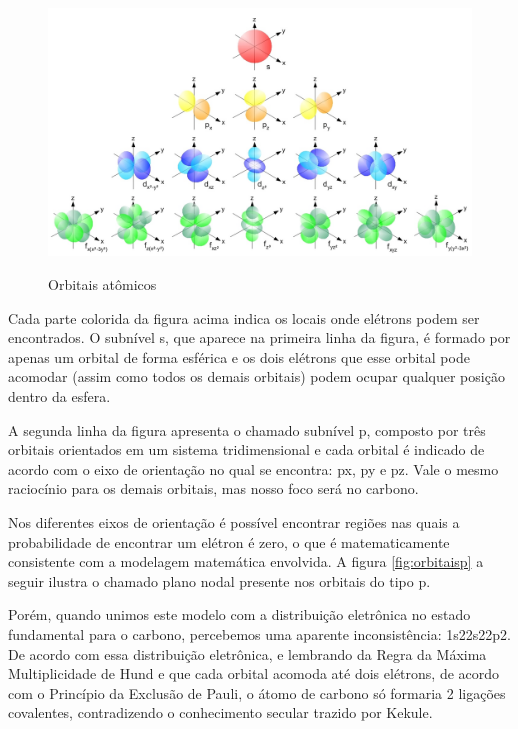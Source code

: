 \documentclass[a4paper,12pt]{book}
\begin{document}
\begin{figure}[h]
	\caption{Orbitais atômicos}
	\vspace{0.25cm}
	\includegraphics[width=1\linewidth]{imagens/figura8_orbitais.jpg} 
	\label{fig:orbitais}
\end{figure}

Cada parte colorida da figura acima indica os locais onde elétrons podem ser encontrados. O subnível s, que aparece na primeira linha da figura, é formado por apenas um orbital de forma esférica e os dois elétrons que esse orbital pode acomodar (assim como todos os demais orbitais) podem ocupar qualquer posição dentro da esfera.

A segunda linha da figura apresenta o chamado subnível p, composto por três orbitais orientados em um sistema tridimensional e cada orbital é indicado de acordo com o eixo de orientação no qual se encontra: px, py e pz. Vale o mesmo raciocínio para os demais orbitais, mas nosso foco será no carbono.

Nos diferentes eixos de orientação é possível encontrar regiões nas quais a probabilidade de encontrar um elétron é zero, o que é matematicamente consistente com a modelagem matemática envolvida. A figura \ref{fig:orbitaisp} a seguir ilustra o chamado plano nodal presente nos orbitais do tipo p.

Porém, quando unimos este modelo com a distribuição eletrônica no estado fundamental para o carbono, percebemos uma aparente inconsistência: 1s22s22p2. De acordo com essa distribuição eletrônica, e lembrando da Regra da Máxima Multiplicidade de Hund e que cada orbital acomoda até dois elétrons, de acordo com o Princípio da Exclusão de Pauli, o átomo de carbono só formaria 2 ligações covalentes, contradizendo o conhecimento secular trazido por Kekule. 
\end{document}
